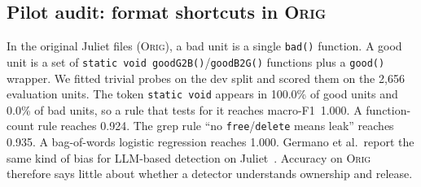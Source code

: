 \documentclass[conference]{IEEEtran}
\newcommand{\Orig}{\textsc{Orig}}
\newcommand{\code}[1]{\texttt{#1}}
\begin{document}
\subsection{Pilot audit: format shortcuts in \Orig}
In the original Juliet files (\Orig{}), a bad unit is a single \code{bad()} function.
A good unit is a set of \code{static void goodG2B()}/\code{goodB2G()} functions plus a \code{good()} wrapper.
We fitted trivial probes on the dev split and scored them on the 2,656 evaluation units. %
The token \code{static void} appears in 100.0\% of good units and 0.0\% of bad units, so a rule that tests for it reaches macro-F1~1.000. %
A function-count rule reaches 0.924. %
The grep rule ``no \code{free}/\code{delete} means leak'' reaches 0.935. %
A bag-of-words logistic regression reaches 1.000. %
Germano et al.\ report the same kind of bias for LLM-based detection on Juliet~\cite{germano2025biased}.
Accuracy on \Orig{} therefore says little about whether a detector understands ownership and release.
\end{document}
